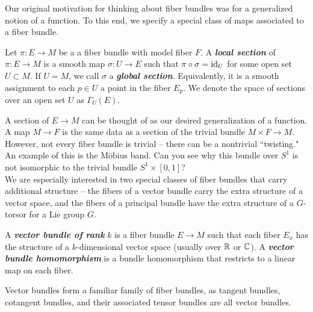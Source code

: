 \documentclass[abstract=on,twoside]{scrreprt}
\begin{document}
Our original motivation for thinking about fiber bundles was for a generalized notion of
a function. To this end, we specify a special class of maps associated to a fiber
bundle.
%
\begin{definition}
Let $\pi : E \to M$ be a a fiber bundle with model fiber $F$.
A \textbf{\textit{local section}} of $\pi : E \to M$ is a smooth map $\sigma : U \to E$
such that $\pi \circ \sigma = \operatorname{id}_U$ for some open set $U \subset M$. If $U = M$, we
call $\sigma $ a \textbf{\textit{global section}}. Equivalently, it is a smooth assignment
to each $p \in U$ a point in the fiber $E_p$. We denote the space of sections over
an open set $U$ as $\Gamma_U(E)$.
\end{definition}
%
A section of $E \to M$ can be thought of as our desired generalization of a function.
A map $M \to F$ is the same data as a section of the trivial bundle $M \times F \to M$.
However, not every fiber bundle is trivial -- there can be a nontrivial ``twisting."
An example of this is the M\"obius band. Can you see why this bundle over $S^1$ is not
isomorphic to the trivial bundle $S^1 \times [0,1]$? \\

We are especially interested in two special classes of fiber bundles that carry
additional structure -- the fibers of a vector bundle carry the extra structure of a
vector space, and the fibers of a principal bundle have the extra structure of a
$G$-torsor for a Lie group $G$.
%
\begin{definition}
A \textbf{\textit{vector bundle of rank}} $k$ is a fiber bundle $E \to M$ such that each
fiber $E_x$ has the structure of a $k$-dimensional vector space (usually over $\mathbb{R}$ or
$\mathbb{C}$). A \textbf{\textit{vector bundle homomorphism}} is a bundle homomorphism that
restricts to a linear map on each fiber.
\end{definition}
%
Vector bundles form a familiar family of fiber bundles, as tangent bundles,
cotangent bundles, and their associated tensor bundles are all vector bundles.
%
\end{document}
